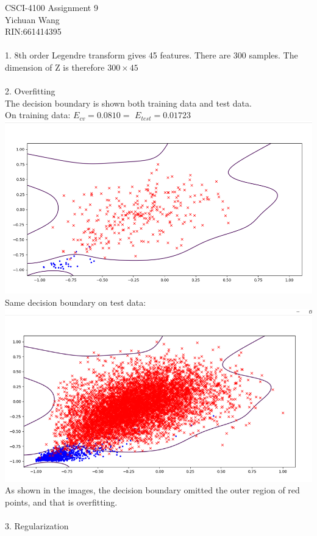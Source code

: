 \documentclass[12pt]{article}
\begin{document}
CSCI-4100 Assignment 9\\
Yichuan Wang \\
RIN:661414395\\\\
1. 8th order Legendre transform gives 45 features. There are 300 samples. The dimension of Z is therefore $300\times45$\\\\
2. Overfitting\\
The decision boundary is shown both training data and test data. \\
On training data: $E_{cv}=0.0810=$ $E_{test}=0.01723$\\
\includegraphics[scale=0.5]{images/lambda_0_train}\\
Same decision boundary on test data:\\
\includegraphics[scale=1]{images/lambda_0_test}\\
As shown in the images, the decision boundary omitted the outer region of red points, and that is overfitting. \\\\
3. Regularization\\
\end{document}
